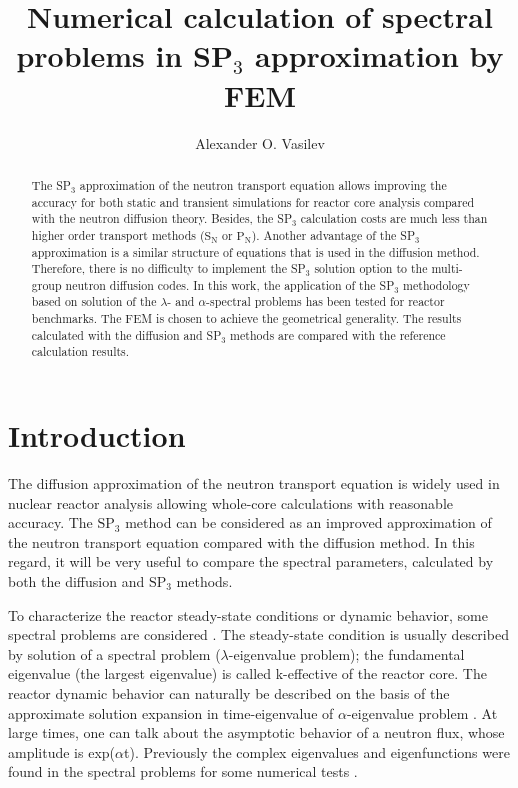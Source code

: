 \documentclass[a4paper]{jpconf}
\begin{document}
\title{Numerical calculation of spectral problems in SP$_3$ approximation by FEM}

\author{Alexander O. Vasilev}

\address{North-Eastern Federal University, 58, Belinskogo, Yakutsk, Russia}


\begin{abstract}
The SP$_3$ approximation of the neutron transport equation allows improving the accuracy for both static and transient simulations for reactor core analysis compared with the neutron diffusion theory. 
Besides, the SP$_3$ calculation costs are much less than higher order transport methods ($\mathrm{S_N}$ or $\mathrm{P_N}$). 
Another advantage of the SP$_3$ approximation is a similar structure of equations that is used in the diffusion method. 
Therefore, there is no difficulty to implement the SP$_3$ solution option to the multi-group neutron diffusion codes. 
In this work, the application of the SP$_3$ methodology based on solution of the $\lambda$- and $\alpha$-spectral problems has been tested for reactor benchmarks. 
The FEM is chosen to achieve the geometrical generality. 
The results calculated with the diffusion and SP$_3$ methods are compared with the reference calculation results.
\end{abstract}

\section{Introduction}
The diffusion approximation of the neutron transport equation is widely used in nuclear reactor analysis allowing whole-core calculations with reasonable accuracy. 
The $\mathrm{SP_3}$ \cite{brantley2000simplified} method can be considered as an improved approximation of the neutron transport equation compared with the diffusion method. 
In this regard, it will be very useful to compare the spectral parameters, calculated by both the diffusion and $\mathrm{SP_3}$ methods. 

To characterize the reactor steady-state conditions or dynamic behavior, some spectral problems are considered \cite{bell1970, stacey2007}. 
The steady-state condition is usually described by solution of a spectral problem ($\lambda$-eigenvalue problem); the fundamental eigenvalue (the largest eigenvalue) is called k-effective of the reactor core. 
The reactor dynamic behavior can naturally be described on the basis of the approximate solution expansion in time-eigenvalue of $\alpha$-eigenvalue problem \cite{bell1970}. 
At large times, one can talk about the asymptotic behavior of a neutron flux, whose amplitude is exp($\alpha$t). 
Previously the complex eigenvalues and eigenfunctions were found in the spectral problems for some numerical tests \cite{avvakumov2017spectral}.
\end{document}
